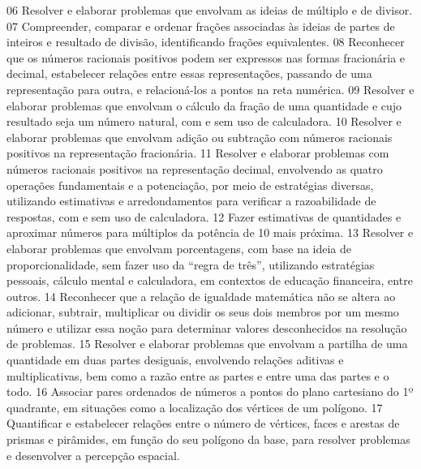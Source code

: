 {{{{{						}
						{06}{%
							Resolver e elaborar problemas que envolvam as ideias de múltiplo e de divisor.
						}
						{07}{%
							Compreender, comparar e ordenar frações associadas às ideias de partes de
							inteiros e resultado de divisão, identificando frações equivalentes.
						}
						{08}{%
							Reconhecer que os números racionais positivos podem ser expressos nas formas
							fracionária e decimal, estabelecer relações entre essas representações, passando de uma
							representação para outra, e relacioná-los a pontos na reta numérica.
						}
						{09}{%
							Resolver e elaborar problemas que envolvam o cálculo da fração de uma
							quantidade e cujo resultado seja um número natural, com e sem uso de calculadora.
						}
						{10}{%
							Resolver e elaborar problemas que envolvam adição ou subtração com números
							racionais positivos na representação fracionária.
						}
						{11}{%
							Resolver e elaborar problemas com números racionais positivos na representação
							decimal, envolvendo as quatro operações fundamentais e a potenciação, por meio de
							estratégias diversas, utilizando estimativas e arredondamentos para verificar a razoabilidade de
							respostas, com e sem uso de calculadora.
						}
						{12}{%
							Fazer estimativas de quantidades e aproximar números para múltiplos da potência
							de 10 mais próxima.
						}
						{13}{%
							Resolver e elaborar problemas que envolvam porcentagens, com base na ideia
							de proporcionalidade, sem fazer uso da “regra de três”, utilizando estratégias pessoais, cálculo
							mental e calculadora, em contextos de educação financeira, entre outros.
						}
						{14}{%
							Reconhecer que a relação de igualdade matemática não se altera ao adicionar,
							subtrair, multiplicar ou dividir os seus dois membros por um mesmo número e utilizar essa
							noção para determinar valores desconhecidos na resolução de problemas.
						}
						{15}{%
							Resolver e elaborar problemas que envolvam a partilha de uma quantidade em
							duas partes desiguais, envolvendo relações aditivas e multiplicativas, bem como a razão entre
							as partes e entre uma das partes e o todo.
						}
						{16}{%
							Associar pares ordenados de números a pontos do plano cartesiano do 1º
							quadrante, em situações como a localização dos vértices de um polígono.
						}
						{17}{%
							Quantificar e estabelecer relações entre o número de vértices, faces e arestas
							de prismas e pirâmides, em função do seu polígono da base, para resolver problemas e
							desenvolver a percepção espacial.
}}}}}

